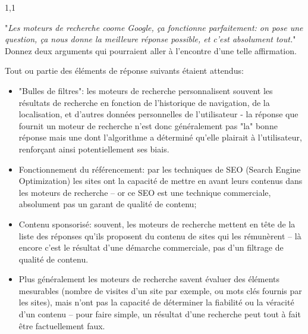 \documentclass[11pt,a4paper]{exam}
\begin{document}
\begin{spacing}{1,1}
\begin{questions}
        	\question[2] "\textit{Les moteurs de recherche coome Google, ça fonctionne parfaitement: on pose une question, ça nous donne la meilleure réponse possible, et c'est absolument tout.}" Donnez deux arguments qui pourraient aller à l'encontre d'une telle affirmation.
        	\begin{solution}
        		Tout ou partie des éléments de réponse suivants étaient attendus:
        		\begin{itemize}
        			\item "Bulles de filtres": les moteurs de recherche personnalisent souvent les résultats de recherche en fonction de l'historique de navigation, de la localisation, et d'autres données personnelles de l'utilisateur - la réponse que fournit un moteur de recherche n'est donc généralement pas "la" bonne réponse mais une dont l'algorithme a déterminé qu'elle plairait à l'utilisateur, renforçant ainsi potentiellement ses biais.
        			\item Fonctionnement du référencement: par les techniques de SEO (Search Engine Optimization) les sites ont la capacité de mettre en avant leurs contenus dans les moteurs de recherche -- or ce SEO est une technique commerciale, absolument pas un garant de qualité de contenu;
        			\item Contenu sponsorisé: souvent, les moteurs de recherche mettent en tête de la liste des réponses qu'ils proposent du contenu de sites qui les rémunèrent -- là encore c'est le résultat d'une démarche commerciale, pas d'un filtrage de qualité de contenu.
        			\item Plus généralement les moteurs de recherche savent évaluer des éléments mesurables (nombre de visites d'un site par exemple, ou mots clés fournis par les sites), mais n'ont pas la capacité de déterminer la fiabilité ou la véracité d'un contenu -- pour faire simple, un résultat d'une recherche peut tout à fait être factuellement faux.
        		\end{itemize}
        	\end{solution}
        	

\end{questions}
\end{spacing}
\end{document}
